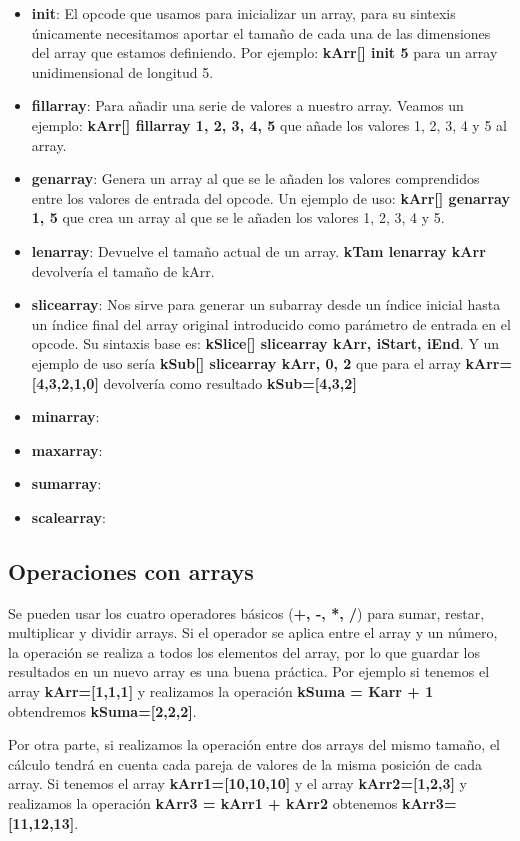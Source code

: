 \begin{itemize}
 \item \textbf{init}: El opcode que usamos para inicializar un array, para su sintexis únicamente necesitamos aportar el tamaño de cada una de las dimensiones del array que estamos definiendo. Por ejemplo: \textbf{kArr[]   init 5} para un array unidimensional de longitud 5.
 \item \textbf{fillarray}: Para añadir una serie de valores a nuestro array. Veamos un ejemplo: \textbf{kArr[] fillarray 1, 2, 3, 4, 5} que añade los valores 1, 2, 3, 4 y 5 al array.
 \item \textbf{genarray}: Genera un array al que se le añaden los valores comprendidos entre los valores de entrada del opcode. Un ejemplo de uso: \textbf{kArr[] genarray   1, 5} que crea un array al que se le añaden los valores 1, 2, 3, 4 y 5.
 \item \textbf{lenarray}: Devuelve el tamaño actual de un array. \textbf{kTam  lenarray  kArr} devolvería el tamaño de kArr. 
 \item \textbf{slicearray}: Nos sirve para generar un subarray desde un índice inicial hasta un índice final del array original introducido como parámetro de entrada en el opcode. Su sintaxis base es: \textbf{kSlice[] slicearray kArr, iStart, iEnd}. Y un ejemplo de uso sería \textbf{kSub[]  slicearray kArr, 0, 2} que para el array \textbf{kArr=[4,3,2,1,0]} devolvería como resultado \textbf{kSub=[4,3,2]}
  \item \textbf{minarray}: 
  \item \textbf{maxarray}: 
  \item \textbf{sumarray}: 
  \item \textbf{scalearray}: 
\end{itemize}

\subsection{Operaciones con arrays}

Se pueden usar los cuatro operadores básicos (\textbf{+, -, *, /}) para sumar, restar, multiplicar y dividir arrays. Si el operador se aplica entre el array y un número, la operación se realiza a todos los elementos del array, por lo que guardar los resultados en un nuevo array es una buena práctica. Por ejemplo si tenemos el array \textbf{kArr=[1,1,1]} y realizamos la operación \textbf{kSuma = Karr + 1} obtendremos \textbf{kSuma=[2,2,2]}.

Por otra parte, si realizamos la operación entre dos arrays del mismo tamaño, el cálculo tendrá en cuenta cada pareja de valores de la misma posición de cada array. Si tenemos el array \textbf{kArr1=[10,10,10]} y el array \textbf{kArr2=[1,2,3]} y realizamos la operación \textbf{kArr3 = kArr1 + kArr2} obtenemos \textbf{kArr3=[11,12,13]}.
